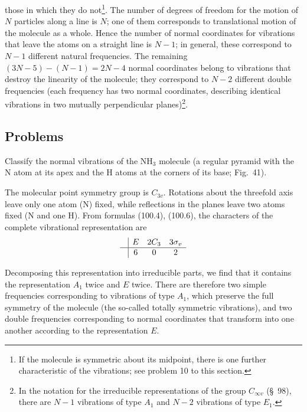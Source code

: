 those in which they do not\footnote{If the molecule is symmetric about its midpoint, there is one further characteristic of the vibrations; see problem 10 to this section.}. The number of degrees of freedom for the motion of $N$ particles along a line is $N$; one of them corresponds to translational motion of the molecule as a whole. Hence the number of normal coordinates for vibrations that leave the atoms on a straight line is $N-1$; in general, these correspond to $N-1$ different natural frequencies. The remaining $(3N-5)-(N-1)=2N-4$ normal coordinates belong to vibrations that destroy the linearity of the molecule; they correspond to $N-2$ different double frequencies (each frequency has two normal coordinates, describing identical vibrations in two mutually perpendicular planes)\footnote{In the notation for the irreducible representations of the group $C_{\infty v}$ (\S~98), there are $N-1$ vibrations of type $A_1$ and $N-2$ vibrations of type $E_1$.}.

\subsection*{Problems}

 Classify the normal vibrations of the $\mathrm{NH_3}$ molecule (a regular pyramid with the N atom at its apex and the H atoms at the corners of its base; Fig.~41).

\SolutionHeading The molecular point symmetry group is $C_{3v}$. Rotations about the threefold axis leave only one atom (N) fixed, while reflections in the planes leave two atoms fixed (N and one H). From formulas (100.4), (100.6), the characters of the complete vibrational representation are
\[
\begin{array}{c|ccc} &E&2C_3&3\sigma_v\\\hline &6&0&2\end{array}
\]
\begin{figure}[ht]
\centering
{}
\caption{}
\end{figure}
Decomposing this representation into irreducible parts, we find that it contains the representation $A_1$ twice and $E$ twice. There are therefore two simple frequencies corresponding to vibrations of type $A_1$, which preserve the full symmetry of the molecule (the so-called totally symmetric vibrations), and two double frequencies corresponding to normal coordinates that transform into one another according to the representation $E$.

